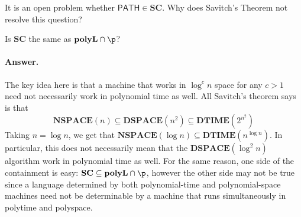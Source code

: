 It is an open problem whether $\mathsf{PATH}\in\mathbf{SC}$. Why does Savitch's Theorem not resolve this question?

Is $\mathbf{SC}$ the same as $\mathbf{polyL}\cap\p$?

\paragraph{Answer.} The key idea here is that a machine that works in $\log^c n$ space for any $c>1$ need not necessarily work in polynomial time as well. All Savitch's theorem says is that
$$\mathbf{NSPACE}(n)\subseteq\mathbf{DSPACE}(n^2)\subseteq\mathbf{DTIME}(2^{n^2})$$
Taking $n=\log n$, we get that $\mathbf{NSPACE}(\log n)\subseteq\mathbf{DTIME}(n^{\log n})$. In particular, this does not necessarily mean that the $\mathbf{DSPACE}(\log^2 n)$ algorithm work in polynomial time as well. For the same reason, one side of the containment is easy: $\mathbf{SC}\subseteq\mathbf{polyL}\cap\p$, however the other side may not be true since a language determined by both polynomial-time and polynomial-space machines need not be determinable by a machine that runs simultaneously in polytime and polyspace.